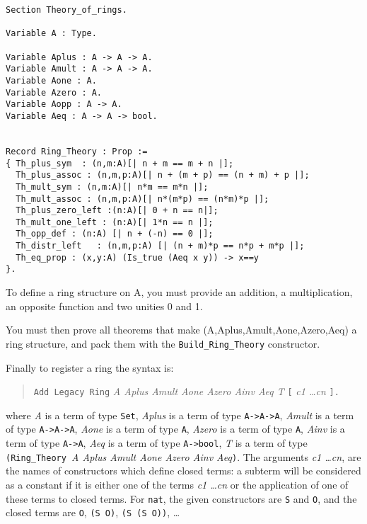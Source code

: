 \begin{small}
\begin{flushleft}
\begin{verbatim}
Section Theory_of_rings.

Variable A : Type.

Variable Aplus : A -> A -> A.
Variable Amult : A -> A -> A.
Variable Aone : A.
Variable Azero : A.
Variable Aopp : A -> A.
Variable Aeq : A -> A -> bool.


Record Ring_Theory : Prop :=
{ Th_plus_sym  : (n,m:A)[| n + m == m + n |];
  Th_plus_assoc : (n,m,p:A)[| n + (m + p) == (n + m) + p |];
  Th_mult_sym : (n,m:A)[| n*m == m*n |];
  Th_mult_assoc : (n,m,p:A)[| n*(m*p) == (n*m)*p |];
  Th_plus_zero_left :(n:A)[| 0 + n == n|];
  Th_mult_one_left : (n:A)[| 1*n == n |];
  Th_opp_def : (n:A) [| n + (-n) == 0 |];
  Th_distr_left   : (n,m,p:A) [| (n + m)*p == n*p + m*p |];
  Th_eq_prop : (x,y:A) (Is_true (Aeq x y)) -> x==y
}.
\end{verbatim}
\end{flushleft}
\end{small}

To define a ring structure on A, you must provide an addition, a
multiplication, an opposite function and two unities 0 and 1.

You must then prove all theorems that make
(A,Aplus,Amult,Aone,Azero,Aeq) 
a ring structure, and pack them with the \verb|Build_Ring_Theory| 
constructor.

Finally to register a ring the syntax is:

\begin{quotation}
  \texttt{Add Legacy Ring} \textit{A Aplus Amult Aone Azero Ainv Aeq T}
  \texttt{[} \textit{c1 \dots cn} \texttt{].}
\end{quotation}

\noindent where \textit{A} is a term of type \texttt{Set}, 
\textit{Aplus} is a term of type \texttt{A->A->A},
\textit{Amult} is a term of type \texttt{A->A->A},
\textit{Aone} is a term of type \texttt{A},
\textit{Azero} is a term of type \texttt{A},
\textit{Ainv} is a term of type \texttt{A->A},
\textit{Aeq} is a term of type \texttt{A->bool},
\textit{T} is a term of type 
\texttt{(Ring\_Theory }\textit{A Aplus Amult Aone Azero Ainv
  Aeq}\texttt{)}.
The arguments \textit{c1 \dots cn}, 
are the names of constructors which define closed terms: a
subterm will be considered as a constant if it is either one of the
terms \textit{c1 \dots cn} or the application of one of these terms to
closed terms. For \texttt{nat}, the given constructors are \texttt{S}
and \texttt{O}, and the closed terms are \texttt{O}, \texttt{(S O)},
\texttt{(S (S O))}, \ldots

